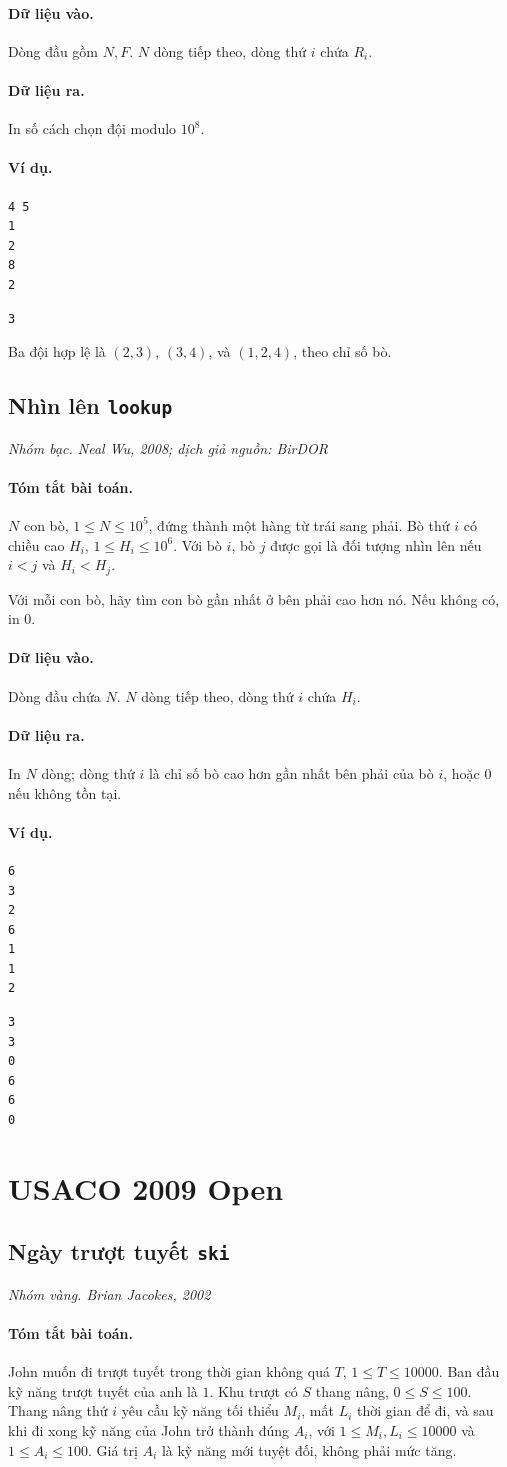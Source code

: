 \documentclass[11pt]{article}
\newcommand{\problem}[4]{%
  \subsection[#1 (#2)]{#1 \hfill {\normalsize\texttt{#2}}}%
  \noindent\textit{#3. #4}\par\smallskip
}
\newcommand{\iosec}[1]{\paragraph{#1}}
\begin{document}
\iosec{Dữ liệu vào.}
Dòng đầu gồm \(N,F\). \(N\) dòng tiếp theo, dòng thứ \(i\) chứa \(R_i\).

\iosec{Dữ liệu ra.}
In số cách chọn đội modulo \(10^8\).

\iosec{Ví dụ.}
\begin{verbatim}
4 5
1
2
8
2
\end{verbatim}

\begin{verbatim}
3
\end{verbatim}

Ba đội hợp lệ là \((2,3)\), \((3,4)\), và \((1,2,4)\), theo chỉ số bò.

\problem{Nhìn lên}{lookup}{Nhóm bạc}{Neal Wu, 2008; dịch giả nguồn: BirDOR}

\iosec{Tóm tắt bài toán.}
\(N\) con bò, \(1\le N\le 10^5\), đứng thành một hàng từ trái sang phải. Bò
thứ \(i\) có chiều cao \(H_i\), \(1\le H_i\le 10^6\). Với bò \(i\), bò
\(j\) được gọi là đối tượng nhìn lên nếu \(i<j\) và \(H_i<H_j\).

Với mỗi con bò, hãy tìm con bò gần nhất ở bên phải cao hơn nó. Nếu không có,
in \(0\).

\iosec{Dữ liệu vào.}
Dòng đầu chứa \(N\). \(N\) dòng tiếp theo, dòng thứ \(i\) chứa \(H_i\).

\iosec{Dữ liệu ra.}
In \(N\) dòng; dòng thứ \(i\) là chỉ số bò cao hơn gần nhất bên phải của bò
\(i\), hoặc \(0\) nếu không tồn tại.

\iosec{Ví dụ.}
\begin{verbatim}
6
3
2
6
1
1
2
\end{verbatim}

\begin{verbatim}
3
3
0
6
6
0
\end{verbatim}

\section{USACO 2009 Open}

\problem{Ngày trượt tuyết}{ski}{Nhóm vàng}{Brian Jacokes, 2002}

\iosec{Tóm tắt bài toán.}
John muốn đi trượt tuyết trong thời gian không quá \(T\),
\(1\le T\le 10000\). Ban đầu kỹ năng trượt tuyết của anh là \(1\). Khu trượt
có \(S\) thang nâng, \(0\le S\le 100\). Thang nâng thứ \(i\) yêu cầu kỹ năng
tối thiểu \(M_i\), mất \(L_i\) thời gian để đi, và sau khi đi xong kỹ năng
của John trở thành đúng \(A_i\), với \(1\le M_i,L_i\le 10000\) và
\(1\le A_i\le 100\). Giá trị \(A_i\) là kỹ năng mới tuyệt đối, không phải mức
tăng.
\end{document}
